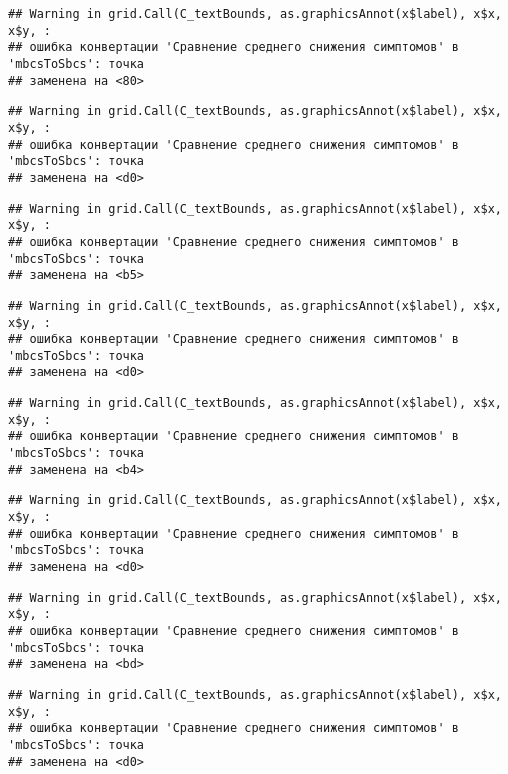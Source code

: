 \documentclass[
]{article}
\begin{document}
\begin{verbatim}
## Warning in grid.Call(C_textBounds, as.graphicsAnnot(x$label), x$x, x$y, :
## ошибка конвертации 'Сравнение среднего снижения симптомов' в 'mbcsToSbcs': точка
## заменена на <80>
\end{verbatim}

\begin{verbatim}
## Warning in grid.Call(C_textBounds, as.graphicsAnnot(x$label), x$x, x$y, :
## ошибка конвертации 'Сравнение среднего снижения симптомов' в 'mbcsToSbcs': точка
## заменена на <d0>
\end{verbatim}

\begin{verbatim}
## Warning in grid.Call(C_textBounds, as.graphicsAnnot(x$label), x$x, x$y, :
## ошибка конвертации 'Сравнение среднего снижения симптомов' в 'mbcsToSbcs': точка
## заменена на <b5>
\end{verbatim}

\begin{verbatim}
## Warning in grid.Call(C_textBounds, as.graphicsAnnot(x$label), x$x, x$y, :
## ошибка конвертации 'Сравнение среднего снижения симптомов' в 'mbcsToSbcs': точка
## заменена на <d0>
\end{verbatim}

\begin{verbatim}
## Warning in grid.Call(C_textBounds, as.graphicsAnnot(x$label), x$x, x$y, :
## ошибка конвертации 'Сравнение среднего снижения симптомов' в 'mbcsToSbcs': точка
## заменена на <b4>
\end{verbatim}

\begin{verbatim}
## Warning in grid.Call(C_textBounds, as.graphicsAnnot(x$label), x$x, x$y, :
## ошибка конвертации 'Сравнение среднего снижения симптомов' в 'mbcsToSbcs': точка
## заменена на <d0>
\end{verbatim}

\begin{verbatim}
## Warning in grid.Call(C_textBounds, as.graphicsAnnot(x$label), x$x, x$y, :
## ошибка конвертации 'Сравнение среднего снижения симптомов' в 'mbcsToSbcs': точка
## заменена на <bd>
\end{verbatim}

\begin{verbatim}
## Warning in grid.Call(C_textBounds, as.graphicsAnnot(x$label), x$x, x$y, :
## ошибка конвертации 'Сравнение среднего снижения симптомов' в 'mbcsToSbcs': точка
## заменена на <d0>
\end{verbatim}
\end{document}

